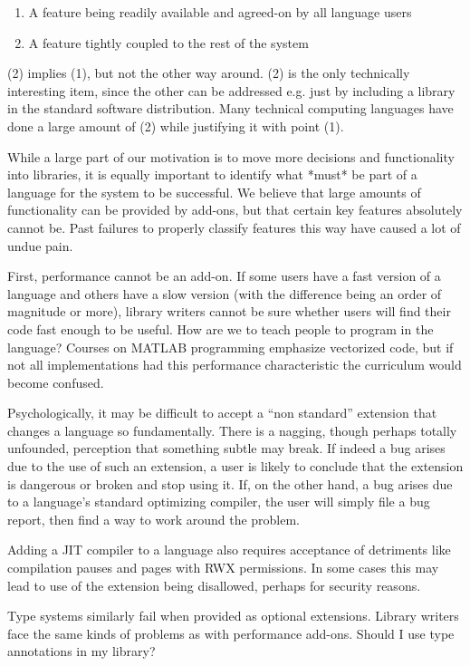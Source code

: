 \begin{enumerate}
\item A feature being readily available and agreed-on by all language users
\item A feature tightly coupled to the rest of the system
\end{enumerate}

(2) implies (1), but not the other way around. (2) is the only technically
interesting item, since the other can be addressed e.g. just by including
a library in the standard software distribution. Many technical computing
languages have done a large amount of (2) while justifying it with point (1).



While a large part of our motivation is to move more decisions and functionality
into libraries, it is equally important to identify what *must* be part of a
language for the system to be successful. We believe that large amounts of
functionality can be provided by add-ons, but that certain key features
absolutely cannot be. Past failures to properly classify features this way have
caused a lot of undue pain.

First, performance cannot be an add-on. If some users have a fast version of
a language and others have a slow version (with the difference being an
order of magnitude or more), library writers cannot be sure whether users
will find their code fast enough to be useful. How are we to teach people to
program in the language? Courses on MATLAB programming emphasize vectorized code,
but if not all implementations had this performance characteristic the
curriculum would become confused.

Psychologically, it may be difficult to accept a ``non standard'' extension
that changes a language so fundamentally. There is a nagging, though perhaps
totally unfounded, perception that something subtle may break. If indeed a
bug arises due to the use of such an extension, a user is likely to conclude
that the extension is dangerous or broken and stop using it. If, on the other
hand, a bug arises due to a language's standard optimizing compiler, the user
will simply file a bug report, then find a way to work around the problem.

Adding a JIT compiler to a language also requires acceptance of detriments
like compilation pauses and pages with RWX permissions. In some cases this
may lead to use of the extension being disallowed, perhaps for security
reasons.

Type systems similarly fail when provided as optional extensions. Library
writers face the same kinds of problems as with performance add-ons. Should I
use type annotations in my library?

